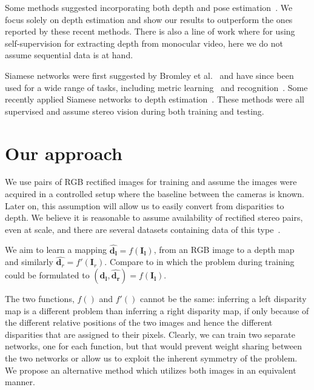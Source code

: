 \documentclass[10pt,twocolumn,letterpaper]{article}
\newcommand{\minisection}[1]{\vspace{1mm}\noindent{\textbf{#1}}}
\begin{document}
Some methods suggested incorporating both depth and pose estimation~\cite{geonet,zhou2017unsupervised}. We focus solely on depth estimation and show our results to outperform the ones reported by these recent methods.
There is also a line of work \cite{kumar2018depthnet, mahjourian2018unsupervised,yang2018deep} where for using self-supervision for extracting depth from monocular video, here we do not assume sequential data is at hand.

\minisection{Siamese networks.} Siamese networks were first suggested by Bromley et al.~\cite{bromley1994signature} and have since been used for a wide range of tasks, including metric learning~\cite{chopra2005learning} and recognition~\cite{koch2015siamese}. Some recently applied Siamese networks to depth estimation~\cite{kendall2017end,luo2016efficient}. These methods were all supervised and assume stereo vision during both training and testing.


\section{Our approach}
We use pairs of RGB rectified images for training and assume the images were acquired in a controlled setup where the baseline between the cameras is known. Later on, this assumption will allow us to easily convert from disparities to depth. We believe it is reasonable to assume availability of rectified stereo pairs, even at scale, and there are several datasets containing data of this type~\cite{Cordts2016TheUnderstanding,geiger2013vision,Menze2015ObjectVehiclesb}.

We aim to learn a mapping $\hat{\mathbf{d_l}} = f(\mathbf{I_l})$, from an RGB image to a depth map and similarly $\hat{\mathbf{d}_r}=f'(\mathbf{I}_r)$. Compare to \cite{monodepth17} in which the problem during training could be formulated to $(\hat{\mathbf{d_l}},\hat{\mathbf{d_r}}) = f(\mathbf{I_l})$.

The two functions, $f()$ and $f'()$ cannot be the same: inferring a left disparity map is a different problem than inferring a right disparity map, if only because of the different relative positions of the two images and hence the different disparities that are assigned to their pixels. Clearly, we can train two separate networks, one for each function, but that would prevent weight sharing between the two networks or allow us to exploit the inherent symmetry of the problem. We propose an alternative method which utilizes both images in an equivalent manner.
\end{document}
